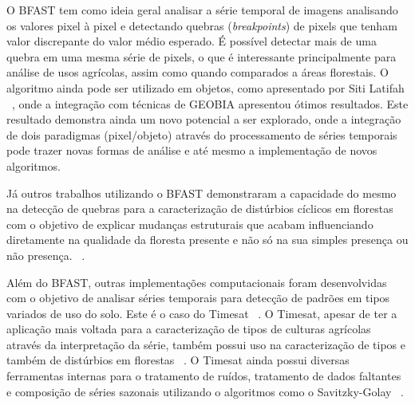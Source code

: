 \documentclass{article}
\begin{document}
\par
O BFAST tem como ideia geral analisar a série temporal de imagens analisando os valores pixel à pixel e detectando quebras (\textit{breakpoints}) de pixels que tenham valor discrepante do valor médio esperado. É possível detectar mais de uma quebra em uma mesma série de pixels, o que é interessante principalmente para análise de usos agrícolas, assim como quando comparados a áreas florestais. O algoritmo ainda pode ser utilizado em objetos, como apresentado por Siti Latifah ~\cite{LATIFAH2016}, onde a integração com técnicas de GEOBIA apresentou ótimos resultados. Este resultado demonstra ainda um novo potencial a ser explorado, onde a integração de dois paradigmas (pixel/objeto) através do processamento de séries temporais pode trazer novas formas de análise e até mesmo a implementação de novos algoritmos.
\par
Já outros trabalhos utilizando o BFAST demonstraram a capacidade do mesmo na detecção de quebras para a caracterização de distúrbios cíclicos em florestas com o objetivo de explicar mudanças estruturais que acabam influenciando diretamente na qualidade da floresta presente e não só na sua simples presença ou não presença. ~\cite{JAKOVAC2017, DUTRIEUX2016112}.
\par
Além do BFAST, outras implementações computacionais foram desenvolvidas com o objetivo de analisar séries temporais para detecção de padrões em tipos variados de uso do solo. Este é o caso do Timesat ~\cite{Jnsson2004TIMESATA}. O Timesat, apesar de ter a aplicação mais voltada para a caracterização de tipos de culturas agrícolas através da interpretação da série, também possui uso na caracterização de tipos e também de distúrbios em florestas ~\cite{Wenbo2017}. O Timesat ainda possui diversas ferramentas internas para o tratamento de ruídos, tratamento de dados faltantes e composição de séries sazonais utilizando o algoritmos como o Savitzky-Golay ~\cite{Savitzky1964}.
\par
\end{document}
